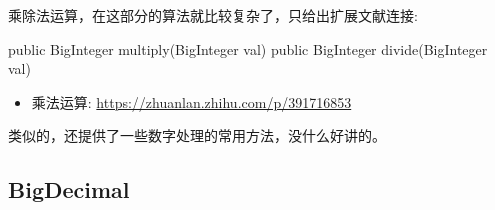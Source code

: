 乘除法运算，在这部分的算法就比较复杂了，只给出扩展文献连接:
\begin{Java}
public BigInteger multiply(BigInteger val)
public BigInteger divide(BigInteger val)
\end{Java}

\begin{itemize}
    \item 乘法运算: \url{https://zhuanlan.zhihu.com/p/391716853}
\end{itemize}

类似的，还提供了一些数字处理的常用方法，没什么好讲的。

\subsection{BigDecimal}












\newpage